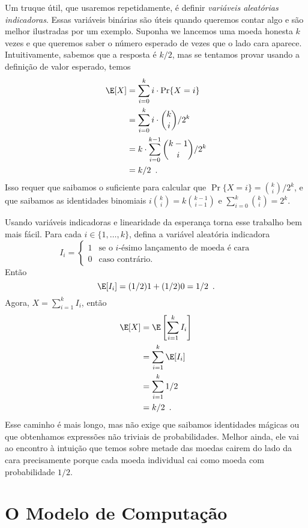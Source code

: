 Um truque útil, que usaremos repetidamente, é definir \emph{variáveis aleatórias indicadoras}.
%
Essas variáveis binárias são úteis quando queremos contar algo e são melhor ilustradas por um exemplo. Suponha we lancemos uma moeda honesta $k$ vezes e que queremos saber o número esperado de vezes que o lado cara aparece.
%
Intuitivamente, sabemos que a resposta é $k/2$,
mas se tentamos provar usando a definição de valor esperado, temos
\begin{align*}
   \E[X] & = \sum_{i=0}^k i\cdot\Pr\{X=i\} \\
         & = \sum_{i=0}^k i\cdot\binom{k}{i}/2^k \\
         & = k\cdot \sum_{i=0}^{k-1}\binom{k-1}{i}/2^k \\
         & = k/2 \enspace .
\end{align*}
Isso requer que saibamos o suficiente para calcular que $\Pr\{X=i\}
= \binom{k}{i}/2^k$, e que saibamos as identidades binomiais 
$i\binom{k}{i}=k\binom{k-1}{i-1}$ e $\sum_{i=0}^{k} \binom{k}{i} = 2^{k}$.

Usando variáveis indicadoras e linearidade da esperança torna esse trabalho bem mais fácil. Para cada
$i\in\{1,\ldots,k\}$, defina a variável aleatória indicadora 
\[
    I_i = \begin{cases}
           1 & \text{se o $i$-ésimo lançamento de moeda é cara} \\
           0 & \text{caso contrário.}
          \end{cases}
\]
Então
\[ \E[I_i] = (1/2)1 + (1/2)0 = 1/2 \enspace . \]
Agora, $X=\sum_{i=1}^k I_i$, então
\begin{align*}
   \E[X] & = \E\left[\sum_{i=1}^k I_i\right] \\
         & = \sum_{i=1}^k \E[I_i] \\
         & = \sum_{i=1}^k 1/2 \\
         & = k/2 \enspace .
\end{align*}
Esse caminho é mais longo, mas não exige que saibamos identidades mágicas ou que obtenhamos expressões não triviais de probabilidades. Melhor ainda, 
ele vai ao encontro à intuição que temos sobre metade das moedas cairem do lado da cara precisamente porque cada moeda individual cai como moeda com probabilidade $1/2$.

\section{O Modelo de Computação}

